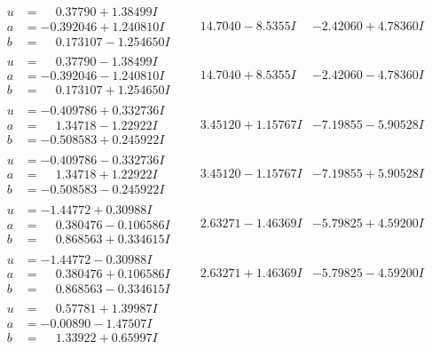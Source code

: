 \documentclass[1p]{elsarticle_modified}
\theoremstyle{definition}
\begin{document}
$$\begin{array}{c|c|c}
\begin{aligned}
u &= \phantom{-}0.37790 + 1.38499 I \\
a &= -0.392046 + 1.240810 I \\
b &= \phantom{-}0.173107 - 1.254650 I\end{aligned}
 & \phantom{-}14.7040 - 8.5355 I & -2.42060 + 4.78360 I \\ \hline\begin{aligned}
u &= \phantom{-}0.37790 - 1.38499 I \\
a &= -0.392046 - 1.240810 I \\
b &= \phantom{-}0.173107 + 1.254650 I\end{aligned}
 & \phantom{-}14.7040 + 8.5355 I & -2.42060 - 4.78360 I \\ \hline\begin{aligned}
u &= -0.409786 + 0.332736 I \\
a &= \phantom{-}1.34718 - 1.22922 I \\
b &= -0.508583 + 0.245922 I\end{aligned}
 & \phantom{-}3.45120 + 1.15767 I & -7.19855 - 5.90528 I \\ \hline\begin{aligned}
u &= -0.409786 - 0.332736 I \\
a &= \phantom{-}1.34718 + 1.22922 I \\
b &= -0.508583 - 0.245922 I\end{aligned}
 & \phantom{-}3.45120 - 1.15767 I & -7.19855 + 5.90528 I \\ \hline\begin{aligned}
u &= -1.44772 + 0.30988 I \\
a &= \phantom{-}0.380476 - 0.106586 I \\
b &= \phantom{-}0.868563 + 0.334615 I\end{aligned}
 & \phantom{-}2.63271 - 1.46369 I & -5.79825 + 4.59200 I \\ \hline\begin{aligned}
u &= -1.44772 - 0.30988 I \\
a &= \phantom{-}0.380476 + 0.106586 I \\
b &= \phantom{-}0.868563 - 0.334615 I\end{aligned}
 & \phantom{-}2.63271 + 1.46369 I & -5.79825 - 4.59200 I \\ \hline\begin{aligned}
u &= \phantom{-}0.57781 + 1.39987 I \\
a &= -0.00890 - 1.47507 I \\
b &= \phantom{-}1.33922 + 0.65997 I\end{aligned}

\end{array}$$
\end{document}
